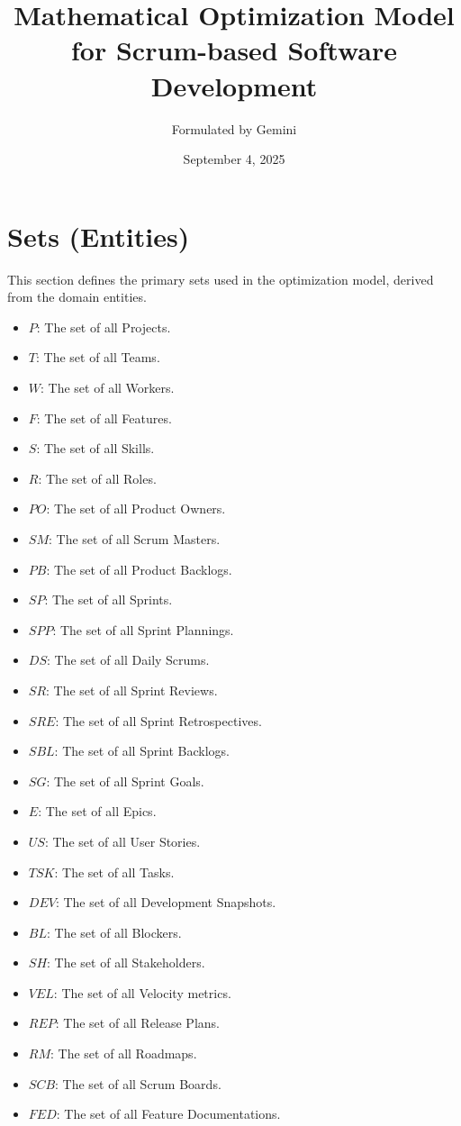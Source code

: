 \documentclass[11pt, a4paper]{article}
\title{Mathematical Optimization Model for Scrum-based Software Development}
\author{Formulated by Gemini}
\date{September 4, 2025}
\begin{document}
\maketitle
\tableofcontents
\newpage

\section{Sets (Entities)}
This section defines the primary sets used in the optimization model, derived from the domain entities.

\begin{itemize}
    \item $P$: The set of all Projects.
    \item $T$: The set of all Teams.
    \item $W$: The set of all Workers.
    \item $F$: The set of all Features.
    \item $S$: The set of all Skills.
    \item $R$: The set of all Roles.
    \item $PO$: The set of all Product Owners.
    \item $SM$: The set of all Scrum Masters.
    \item $PB$: The set of all Product Backlogs.
    \item $SP$: The set of all Sprints.
    \item $SPP$: The set of all Sprint Plannings.
    \item $DS$: The set of all Daily Scrums.
    \item $SR$: The set of all Sprint Reviews.
    \item $SRE$: The set of all Sprint Retrospectives.
    \item $SBL$: The set of all Sprint Backlogs.
    \item $SG$: The set of all Sprint Goals.
    \item $E$: The set of all Epics.
    \item $US$: The set of all User Stories.
    \item $TSK$: The set of all Tasks.
    \item $DEV$: The set of all Development Snapshots.
    \item $BL$: The set of all Blockers.
    \item $SH$: The set of all Stakeholders.
    \item $VEL$: The set of all Velocity metrics.
    \item $REP$: The set of all Release Plans.
    \item $RM$: The set of all Roadmaps.
    \item $SCB$: The set of all Scrum Boards.
    \item $FED$: The set of all Feature Documentations.
\end{itemize}
\end{document}
